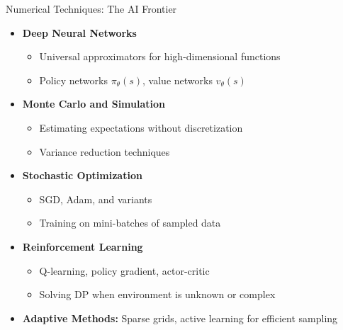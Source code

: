 \begin{frame}{Numerical Techniques: The AI Frontier}
\begin{itemize}
\item \textbf{Deep Neural Networks}
\begin{itemize}
    \item Universal approximators for high-dimensional functions
    \item Policy networks $\pi_\theta(s)$, value networks $v_\theta(s)$
\end{itemize}

\medskip
\item \textbf{Monte Carlo and Simulation}
\begin{itemize}
    \item Estimating expectations without discretization
    \item Variance reduction techniques
\end{itemize}

\medskip
\item \textbf{Stochastic Optimization}
\begin{itemize}
    \item SGD, Adam, and variants
    \item Training on mini-batches of sampled data
\end{itemize}

\medskip
\item \textbf{Reinforcement Learning}
\begin{itemize}
    \item Q-learning, policy gradient, actor-critic
    \item Solving DP when environment is unknown or complex
\end{itemize}

\medskip
\item \textbf{Adaptive Methods:} Sparse grids, active learning for efficient sampling
\end{itemize}
\end{frame}

